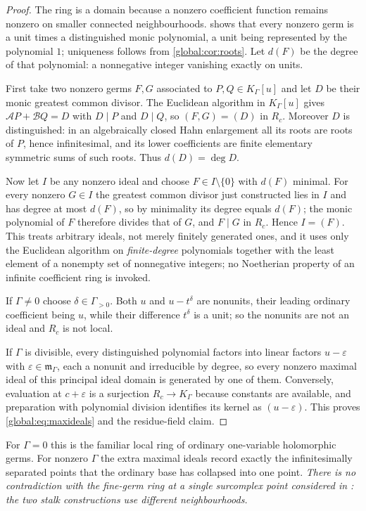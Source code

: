 \documentclass[11pt,letterpaper]{article}
\theoremstyle{definition}
\theoremstyle{remark}
\newcommand{\KK}{K_\Gamma}
\newcommand{\mK}{\mathfrak m_\Gamma}
\numberwithin{equation}{section}
\begin{document}
\begin{proof}
The ring is a domain because a nonzero coefficient function remains nonzero on smaller connected neighbourhoods.  shows that every nonzero germ is a unit times a distinguished monic polynomial, a unit being represented by the polynomial $1$; uniqueness follows from \cref{global:cor:roots}. Let $d(F)$ be the degree of that polynomial: a nonnegative integer vanishing exactly on units.

First take two nonzero germs $F,G$ associated to $P,Q\in\KK[u]$ and let $D$ be their monic greatest common divisor. The Euclidean algorithm in $\KK[u]$ gives $\mathcal A P+\mathcal B Q=D$ with $D\mid P$ and $D\mid Q$, so $(F,G)=(D)$ in $R_c$. Moreover $D$ is distinguished: in an algebraically closed Hahn enlargement all its roots are roots of $P$, hence infinitesimal, and its lower coefficients are finite elementary symmetric sums of such roots. Thus $d(D)=\deg D$.

Now let $I$ be any nonzero ideal and choose $F\in I\setminus\{0\}$ with $d(F)$ minimal. For every nonzero $G\in I$ the greatest common divisor just constructed lies in $I$ and has degree at most $d(F)$, so by minimality its degree equals $d(F)$; the monic polynomial of $F$ therefore divides that of $G$, and $F\mid G$ in $R_c$. Hence $I=(F)$. This treats arbitrary ideals, not merely finitely generated ones, and it uses only the Euclidean algorithm on \emph{finite-degree} polynomials together with the least element of a nonempty set of nonnegative integers; no Noetherian property of an infinite coefficient ring is invoked.

If $\Gamma\ne0$ choose $\delta\in\Gamma_{>0}$. Both $u$ and $u-t^\delta$ are nonunits, their leading ordinary coefficient being $u$, while their difference $t^\delta$ is a unit; so the nonunits are not an ideal and $R_c$ is not local.

If $\Gamma$ is divisible, every distinguished polynomial factors into linear factors $u-\varepsilon$ with $\varepsilon\in\mK$, each a nonunit and irreducible by degree, so every nonzero maximal ideal of this principal ideal domain is generated by one of them. Conversely, evaluation at $c+\varepsilon$ is a surjection $R_c\to\KK$ because constants are available, and preparation with polynomial division identifies its kernel as $(u-\varepsilon)$. This proves \eqref{global:eq:maxideals} and the residue-field claim.
\end{proof}

For $\Gamma=0$ this is the familiar local ring of ordinary one-variable holomorphic germs. For nonzero $\Gamma$ the extra maximal ideals record exactly the infinitesimally separated points that the ordinary base has collapsed into one point. \emph{There is no contradiction with the fine-germ ring at a single surcomplex point considered in \cite{Source}: the two stalk constructions use different neighbourhoods.}
\end{document}
